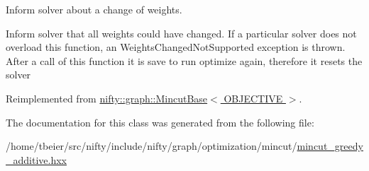Inform solver about a change of weights. 

Inform solver that all weights could have changed. If a particular solver does not overload this function, an Weights\+Changed\+Not\+Supported exception is thrown. After a call of this function it is save to run optimize again, therefore it resets the solver 

Reimplemented from \hyperlink{classnifty_1_1graph_1_1MincutBase_ab9fcebb8fd780fbe7492ec7e8d1dc2d4}{nifty\+::graph\+::\+Mincut\+Base$<$ O\+B\+J\+E\+C\+T\+I\+V\+E $>$}.



The documentation for this class was generated from the following file\+:\begin{DoxyCompactItemize}
\item 
/home/tbeier/src/nifty/include/nifty/graph/optimization/mincut/\hyperlink{mincut__greedy__additive_8hxx}{mincut\+\_\+greedy\+\_\+additive.\+hxx}\end{DoxyCompactItemize}
